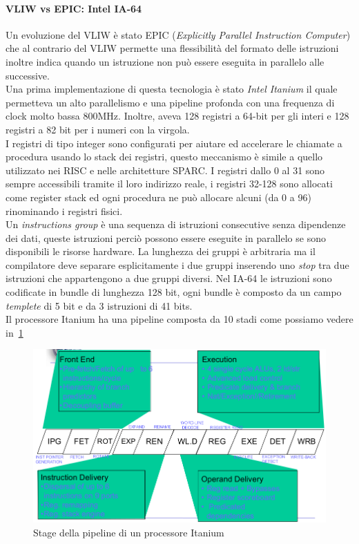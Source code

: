 \paragraph{VLIW vs EPIC: Intel IA-64}
Un evoluzione del VLIW è stato EPIC (\emph{Explicitly Parallel Instruction Computer}) che al contrario del VLIW permette una flessibilità del formato delle istruzioni inoltre indica quando un istruzione non può essere eseguita in parallelo alle successive.\\
Una prima implementazione di questa tecnologia è stato \emph{Intel Itanium} il quale permetteva un alto parallelismo e una pipeline profonda con una frequenza di clock molto bassa 800MHz. Inoltre, aveva 128 registri a 64-bit per gli interi e 128 registri a 82 bit per i numeri con la virgola.\\
I registri di tipo integer sono configurati per aiutare ed accelerare le chiamate a procedura usando lo stack dei registri, questo meccanismo è simile a quello utilizzato nei RISC e nelle architetture SPARC. I registri dallo 0 al 31 sono sempre accessibili tramite il loro indirizzo reale, i registri 32-128 sono allocati come register stack ed ogni procedura ne può allocare alcuni (da 0 a 96) rinominando i registri fisici.\\
Un \emph{instructions group} è una sequenza di istruzioni consecutive senza dipendenze dei dati, queste istruzioni perciò possono essere eseguite in parallelo se sono disponibili le risorse hardware. La lunghezza dei gruppi è arbitraria ma il compilatore deve separare esplicitamente i due gruppi inserendo uno \emph{stop} tra due istruzioni che appartengono a due gruppi diversi. Nel IA-64 le istruzioni sono codificate in bundle di lunghezza 128 bit, ogni bundle è composto da un campo \emph{templete} di 5 bit e da 3 istruzioni di 41 bits.\\
Il processore Itanium ha una pipeline composta da 10 stadi come possiamo vedere in \figurename\,\ref{fig:itapipe}
\begin{figure}
\centering
\includegraphics[scale=0.4]{img/itapipe.png}
\caption{Stage della pipeline di un processore Itanium}\label{fig:itapipe}
\end{figure}
